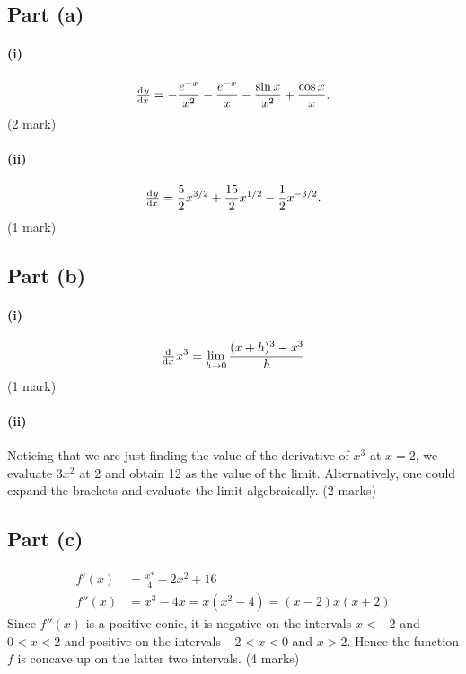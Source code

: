 \documentclass[a4paper]{report}
\begin{document}
\subsection*{Part (a)}
\paragraph{(i)}
\begin{displaymath}
  \od{y}{x} = -\frac{e^{-x}}{x^2} - \frac{e^{-x}}{x} - \frac{\sin x}{x^2} + \frac{\cos x}{x}.
\end{displaymath}
(2 mark)

\paragraph{(ii)}
\begin{displaymath}
  \od{y}{x} = \frac{5}{2} x^{3/2} + \frac{15}{2} x^{1/2} - \frac{1}{2} x^{-3/2}.
\end{displaymath}
(1 mark)

\subsection*{Part (b)}
\paragraph{(i)}
\begin{displaymath}
  \od{}{x} x^3 = \lim_{h \to 0} \frac{(x + h)^3 - x^3}{h}
\end{displaymath}
(1 mark)

\paragraph{(ii)}
Noticing that we are just finding the  value of the derivative of $ x^3 $ at $ x = 2 $, we evaluate $ 3x^2 $ at 2 and obtain 12 as
the value of the limit. Alternatively, one could expand the brackets and evaluate the limit algebraically.
(2 marks)

\subsection*{Part (c)}
\begin{align*}
  f'(x) &= \frac{x^4}{4} - 2x^2 + 16\\
  f''(x) &= x^3 - 4x = x(x^2 - 4) = (x - 2)x(x + 2)
\end{align*}
Since $ f''(x) $ is a positive conic, it is negative on the intervals $ x < -2 $ and $ 0 < x < 2 $ and positive on
the intervals $ -2 < x < 0 $ and $ x > 2 $. Hence the function $ f $ is concave up on the latter two intervals.
(4 marks)
\end{document}
